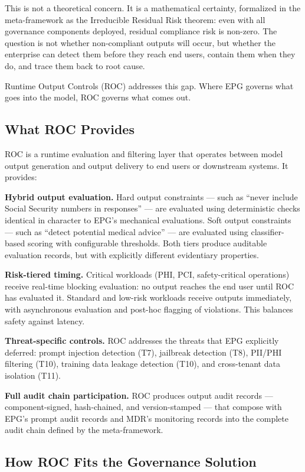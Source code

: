 This is not a theoretical concern. It is a mathematical certainty, formalized in the meta-framework as the Irreducible Residual Risk theorem: even with all governance components deployed, residual compliance risk is non-zero. The question is not whether non-compliant outputs will occur, but whether the enterprise can detect them before they reach end users, contain them when they do, and trace them back to root cause.

Runtime Output Controls (ROC) addresses this gap. Where EPG governs what goes into the model, ROC governs what comes out.

\subsection{What ROC Provides}


ROC is a runtime evaluation and filtering layer that operates between model output generation and output delivery to end users or downstream systems. It provides:

\textbf{Hybrid output evaluation.} Hard output constraints --- such as ``never include Social Security numbers in responses'' --- are evaluated using deterministic checks identical in character to EPG's mechanical evaluations. Soft output constraints --- such as ``detect potential medical advice'' --- are evaluated using classifier-based scoring with configurable thresholds. Both tiers produce auditable evaluation records, but with explicitly different evidentiary properties.

\textbf{Risk-tiered timing.} Critical workloads (PHI, PCI, safety-critical operations) receive real-time blocking evaluation: no output reaches the end user until ROC has evaluated it. Standard and low-risk workloads receive outputs immediately, with asynchronous evaluation and post-hoc flagging of violations. This balances safety against latency.

\textbf{Threat-specific controls.} ROC addresses the threats that EPG explicitly deferred: prompt injection detection (T7), jailbreak detection (T8), PII/PHI filtering (T10), training data leakage detection (T10), and cross-tenant data isolation (T11).

\textbf{Full audit chain participation.} ROC produces output audit records --- component-signed, hash-chained, and version-stamped --- that compose with EPG's prompt audit records and MDR's monitoring records into the complete audit chain defined by the meta-framework.

\subsection{How ROC Fits the Governance Solution}


